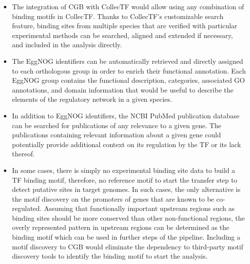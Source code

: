 \begin{itemize}
\item The integration of CGB with CollecTF would allow using any combination of
  binding motifs in CollecTF\@. Thanks to CollecTF's customizable search feature,
  binding sites from multiple species that are verified with particular
  experimental methods can be searched, aligned and extended if necessary, and
  included in the analysis directly.

\item The EggNOG identifiers can be automatically retrieved and directly
  assigned to each orthologous group in order to enrich their functional
  annotation. Each EggNOG group contains the functional description,
  categories, associated GO annotations, and domain information that would be
  useful to describe the elements of the regulatory network in a given species.

\item In addition to EggNOG identifiers, the NCBI PubMed publication database
  can be searched for publications of any relevance to a given gene. The
  publications containing relevant information about a given gene could
  potentially provide additional context on its regulation by the TF or its
  lack thereof.

\item In some cases, there is simply no experimental binding site data to build
  a TF binding motif, therefore, no reference motif to start the transfer step
  to detect putative sites in target genomes. In such cases, the only
  alternative is the motif discovery on the promoters of genes that are known
  to be co-regulated. Assuming that functionally important upstream regions
  such as binding sites should be more conserved than other non-functional
  regions, the overly represented pattern in upstream regions can be determined
  as the binding motif which can be used in further steps of the
  pipeline. Including a motif discovery to CGB would eliminate the dependency
  to third-party motif discovery tools to identify the binding motif to start
  the analysis.

\end{itemize}
